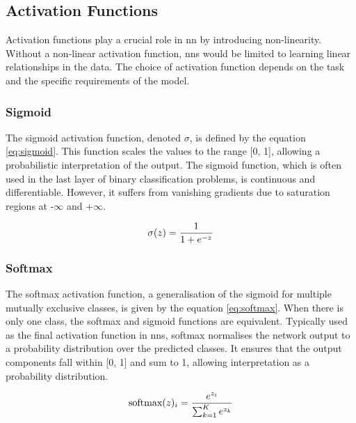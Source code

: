 \subsection{Activation Functions}
\label{sub:AF}

Activation functions play a crucial role in \gls{nn} by introducing non-linearity. Without a non-linear activation function, \glspl{nn} would be limited to learning linear relationships in the data. The choice of activation function depends on the task and the specific requirements of the model.

\subsubsection{Sigmoid}
\label{subsub:Sigmoid}
The sigmoid activation function, denoted $\sigma$, is defined by the equation \ref{eq:sigmoid}. This function scales the values to the range [0, 1], allowing a probabilistic interpretation of the output. The sigmoid function, which is often used in the last layer of binary classification problems, is continuous and differentiable. However, it suffers from vanishing gradients due to saturation regions at -$\infty$ and +$\infty$.

\begin{equation}
    \centering
    \sigma(z) = \frac{1}{1 + e^{-z}}
    \label{eq:sigmoid}
\end{equation}

\subsubsection{Softmax}
\label{subsub:Softmax}
The softmax activation function, a generalisation of the sigmoid for multiple mutually exclusive classes, is given by the equation \ref{eq:softmax}. When there is only one class, the softmax and sigmoid functions are equivalent. Typically used as the final activation function in \glspl{nn}, softmax normalises the network output to a probability distribution over the predicted classes. It ensures that the output components fall within [0, 1] and sum to 1, allowing interpretation as a probability distribution.

\begin{equation}
    \centering
    \text{softmax}(z)_i = \frac{e^{z_i}}{\sum_{k=1}^K e^{z_k}}
    \label{eq:softmax}
\end{equation}

